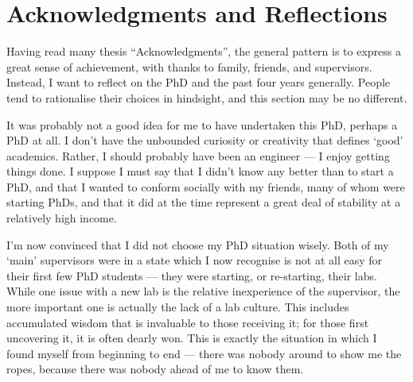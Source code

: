 

\bigskip

\begingroup
\let\clearpage\relax
\let\cleardoublepage\relax
\let\cleardoublepage\relax
\chapter*{Acknowledgments and Reflections}

Having read many thesis ``Acknowledgments'', the general pattern is to express a great sense of achievement, with thanks to family, friends, and supervisors.
Instead, I want to reflect on the PhD and the past four years generally.
People tend to rationalise their choices in hindsight, and this section may be no different.

It was probably not a good idea for me to have undertaken this PhD, perhaps a PhD at all.
I don't have the unbounded curiosity or creativity that defines `good' academics.
Rather, I should probably have been an engineer --- I enjoy getting things done.
I suppose I must say that I didn't know any better than to start a PhD, and that I wanted to conform socially with my friends, many of whom were starting PhDs, and that it did at the time represent a great deal of stability at a relatively high income.

I'm now convinced that I did not choose my PhD situation wisely.
Both of my `main' supervisors were in a state which I now recognise is not at all easy for their first few PhD students --- they were starting, or re-starting, their labs.
While one issue with a new lab is the relative inexperience of the supervisor, the more important one is actually the lack of a lab culture.
This includes accumulated wisdom that is invaluable to those receiving it; for those first uncovering it, it is often dearly won.
This is exactly the situation in which I found myself from beginning to end --- there was nobody around to show me the ropes, because there was nobody ahead of me to know them.

